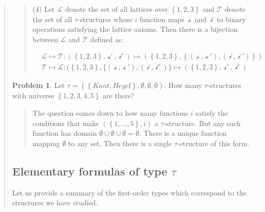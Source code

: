 \documentclass[a4paper, 12pt]{article}
\theoremstyle{definition}
\newtheorem{problem}{Problem}
\theoremstyle{definition}
\theoremstyle{definition}
\begin{document}
\begin{quote}
\begin{quote}
(4) Let $\mathcal{L}$ denote the set of all lattices over $\left\{ 1, 2, 3
\right\} $ and $\mathcal{T}$ denote the set of all $\tau$-structures whose $i$
function maps $~\mathcal{s}~$ and $~\mathcal{i}~$ to binary operations
satisfying the lattice axioms. Then there is a bijection between $\mathcal{L}$
and $\mathcal{T}$ defined as:
 

\begin{align*}
    &\mathcal{L} \mapsto \mathcal{T} : (\left\{ 1, 2, 3 \right\} , ~\mathcal{s}'~, ~\mathcal{i}'~ ) \mapsto (\left\{ 1, 2, 3 \right\} , \left\{ (~\mathcal{s}~, ~\mathcal{s}~'), (~\mathcal{i}~, ~\mathcal{i}~') \right\} )    \\ 
    &\mathcal{T} \mapsto \mathcal{L} : (\left\{ 1, 2, 3 \right\}, \{(~\mathcal{s}~, ~\mathcal{s}~'), (~\mathcal{i}~, ~\mathcal{i}'~ )\} \mapsto (\left\{ 1, 2, 3 \right\}, ~\mathcal{s}'~, ~\mathcal{i}'~ )
\end{align*}



\end{quote}
\normalsize

\begin{problem}
    Let $\tau = (\left\{ Kant, Hegel \right\}, \emptyset, \emptyset, \emptyset )$. 
    How many $\tau$-structures with universe $\left\{ 1, 2, 3, 4, 5 \right\} $
    are there?
\end{problem}


\small
\begin{quote}

The question comes down to how many functions $i$ satisfy the conditions that
make $(\left\{ 1,\ldots,5 \right\}, i)$ a $\tau$-structure. But any such
function has domain $\emptyset \cup \emptyset \cup \emptyset = \emptyset$.
There is a unique function mapping $\emptyset$ to any set. Then there is a
single $\tau$-structure of this form.

\end{quote}
\normalsize


\subsection{Elementary formulas of type $\tau$}

Let us provide a summary of the first-order types which correspond to the 
structures we have studied. 


\end{quote}
\end{document}
